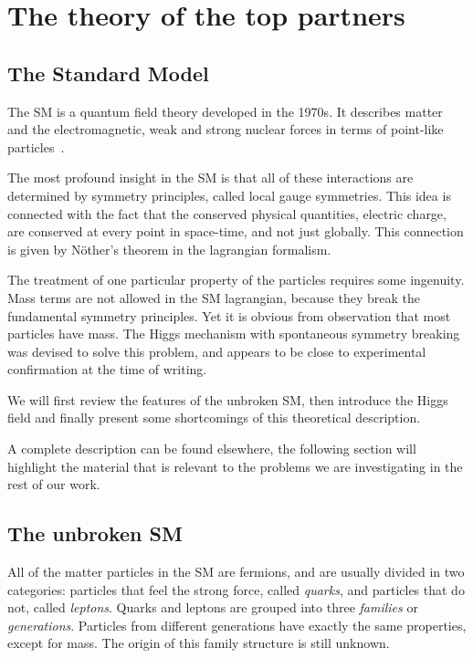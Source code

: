 \chapter{The theory of the top partners}\label{ch:top_partner}
\section{The Standard Model}

The SM is a quantum field theory developed in the 1970s. It
describes matter and the electromagnetic, weak and strong nuclear forces
in terms of point-like
particles~\cite{PhysRevLett.19.1264,Glashow1961579}. 

The most profound insight in the SM is that all of these interactions are
determined by symmetry principles, called local gauge symmetries.
This idea is connected with the fact that the conserved physical quantities,
\eg electric charge, are conserved at every point in space-time, and not
just globally. This connection is given by N\"other's theorem in the
lagrangian formalism.

The treatment of one particular property of the particles requires some
ingenuity. Mass terms are not allowed in the SM lagrangian, because they
break the fundamental symmetry principles. Yet it is obvious from
observation that most particles have mass. The Higgs mechanism with
spontaneous symmetry breaking was devised to solve this problem, and appears
to be close to experimental confirmation at the time of writing.

We will first review the features of the unbroken SM, then introduce the
Higgs field and finally present some shortcomings of this theoretical
description.

A complete description can be found elsewhere, the following
section will highlight the material that is relevant to the problems we are
investigating in the rest of our work.

\section{The unbroken SM}
All of the matter particles in the SM are fermions, and are usually divided
in two categories: particles that feel the strong force, called
\emph{quarks}, and particles that do not, called \emph{leptons}. Quarks and
leptons are grouped into three \emph{families} or \emph{generations}. Particles from different
generations have exactly the same properties, except for mass. The origin of
this family structure is still unknown.

